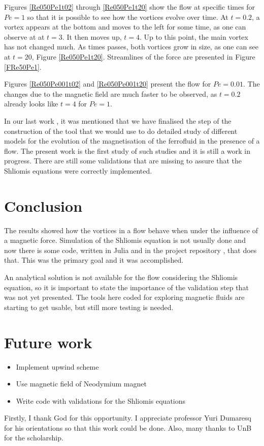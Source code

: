\documentclass[journal]{IEEEtran}
\begin{document}
Figures \ref{Re050Pe1t02} through  \ref{Re050Pe1t20} show the flow at specific times for $\mathit{Pe}=1$ so that it is possible to see how the vortices evolve over time. At $t=0.2$, a vortex appears at the bottom and moves to the left for some time, as one can observe at at $t=3$. It then moves up, $t=4$. Up to this point, the main vortex has not changed much. As times passes, both vortices grow in size, as one can see at $t=20$, Figure \ref{Re050Pe1t20}. Streamlines of the force are presented in Figure \ref{FRe50Pe1}.

Figures \ref{Re050Pe001t02} and  \ref{Re050Pe001t20} present the flow for $\mathit{Pe}=0.01$. The changes due to the magnetic field are much faster to be observed, as $t=0.2$ already looks like $t=4$ for $\mathit{Pe}=1$.


In our last work \cite{ataias2015}, it was mentioned that we have finalised the step of the construction of the tool that we would use to do detailed study of different models for the evolution of the magnetisation of the ferrofluid in the presence of a flow. The present work is the first study of such studies and it is still a work in progress. There are still some validations that are missing to assure that the Shliomis equations were correctly implemented.


\section{Conclusion}

The results showed how the vortices in a flow behave when under the influence of a magnetic force. Simulation of the Shliomis equation is not usually done and now there is some code, written in Julia and in the project repository \cite{gitHubFerrofluidos}, that does that. This was the primary goal and it was accomplished.

An analytical solution is not available for the flow considering the Shliomis equation, so it is important to state the importance of the validation step that was not yet presented. The tools here coded for exploring magnetic fluids are starting to get usable, but still more testing is needed.


\section{Future work}
\begin{itemize}
	\item Implement upwind scheme
	\item Use magnetic field of Neodymium magnet\cite{McCaigClegg}
	\item Write code with validations for the Shliomis equations
\end{itemize}


Firstly, I thank God for this opportunity. I appreciate professor Yuri Dumaresq for his orientations so that this work could be done. Also, many thanks to UnB for the scholarship.



\end{document}

